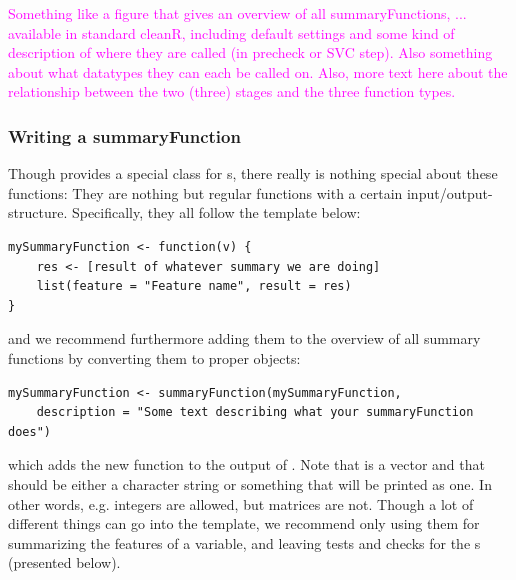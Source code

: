 \documentclass[article]{jss}
\newcommand{\hl}[1]{\textcolor{magenta}{#1}}
\begin{document}
\hl{Something like a figure that gives an overview of all summaryFunctions, ... available in standard cleanR, including default settings and some kind of description of where they are called (in precheck or SVC step). Also something about what datatypes they can each be called on. Also, more text here about the relationship between the two (three) stages and the three function types.}


\subsubsection{Writing a summaryFunction}
Though  provides a special class for s, there really is nothing special about these functions: They are nothing but regular functions with a certain input/output-structure. Specifically, they all follow the template below:
\begin{Verbatim}
mySummaryFunction <- function(v) {
	res <- [result of whatever summary we are doing]
	list(feature = "Feature name", result = res)
}
\end{Verbatim}
and we recommend furthermore adding them to the overview of all summary functions by converting them to proper  objects:
\begin{Verbatim}
mySummaryFunction <- summaryFunction(mySummaryFunction,
	description = "Some text describing what your summaryFunction does")
\end{Verbatim}
which adds the new function to the output of . Note that  is a vector and that  should be either a character string or something that will be printed as one. In other words, e.g. integers are allowed, but matrices are not. Though a lot of different things can go into the  template, we recommend only using them for summarizing the features of a variable, and leaving tests and checks for the s (presented below).
\end{document}
